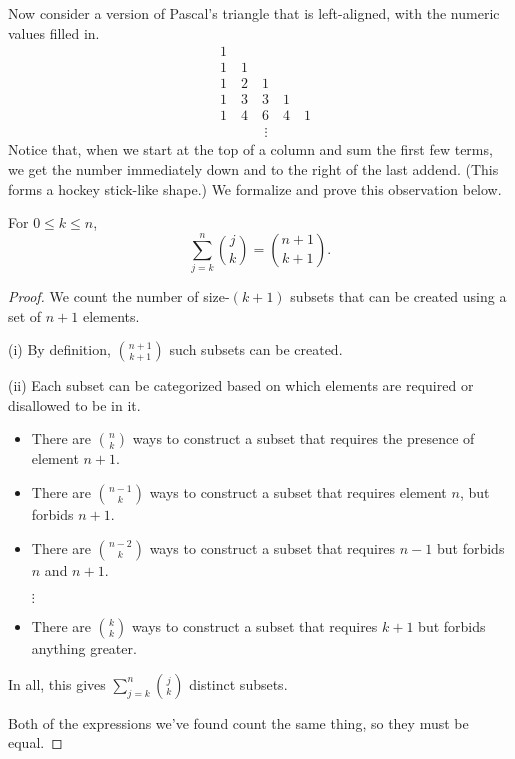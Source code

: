 \documentclass[../m055main.tex]{subfiles}
\begin{document}
Now consider a version of Pascal's triangle that is left-aligned, with the numeric values filled in.
\begin{align*}
    & 1 \quad \\
    & 1 \quad 1 \\
    & 1 \quad 2 \quad 1 \\
    & 1 \quad 3 \quad 3 \quad 1 \\
    & 1 \quad 4 \quad 6 \quad 4 \quad 1 \\
    & \phantom{1 \quad 4 \quad\,} \vdots
\end{align*}
Notice that, when we start at the top of a column and sum the first few terms, we get the number immediately down and to the right of the last addend.
(This forms a hockey stick-like shape.)
We formalize and prove this observation below.

\begin{theorem}
    For $0 \leq k \leq n$,
    \[ \sum_{j=k}^{n} \binom{j}{k} = \binom{n+1}{k+1}. \]
\end{theorem}

\begin{proof}
    We count the number of size-$(k+1)$ subsets that can be created using a set of $n+1$ elements.
    \smallskip

    (i) By definition, $\binom{n+1}{k+1}$ such subsets can be created.
    \smallskip

    (ii) Each subset can be categorized based on which elements are required or disallowed to be in it.
    \begin{itemize}
        \item There are $\binom{n}{k}$ ways to construct a subset that requires the presence of element $n+1$.
        \item There are $\binom{n-1}{k}$ ways to construct a subset that requires element $n$, but forbids $n+1$.
        \item There are $\binom{n-2}{k}$ ways to construct a subset that requires $n-1$ but forbids $n$ and $n+1$.
        \item[$\vdots$]
        \item There are $\binom{k}{k}$ ways to construct a subset that requires $k+1$ but forbids anything greater.
    \end{itemize}
    In all, this gives $\sum\limits_{j=k}^{n} \binom{j}{k}$ distinct subsets.

    Both of the expressions we've found count the same thing, so they must be equal.
\end{proof}
\end{document}
